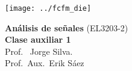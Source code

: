 \documentclass[
  11pt,
  letterpaper,
   addpoints,
  ]{exam}
\begin{document}
\noindent
\begin{minipage}{0.47\textwidth}
\texttt{[image: ../fcfm\_die]}
\end{minipage}
\begin{minipage}{0.53\textwidth}
\begin{center} 
\large\textbf{Análisis de señales} (EL3203-2) \\
\large\textbf{Clase auxiliar 1} \\
\normalsize Prof.~ Jorge Silva.\\
\normalsize Prof.~Aux.~Erik Sáez
\end{center}
\end{minipage}

\vspace{0.5cm}
\noindent
\vspace{.85cm}
\end{document}
